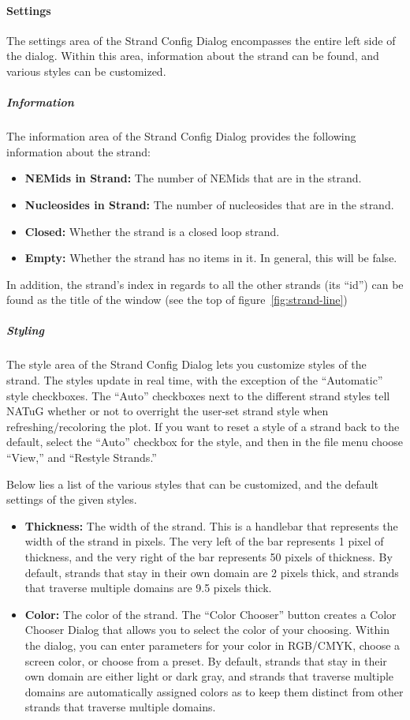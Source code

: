 \documentclass[titlepage]{article}
\begin{document}
\paragraph{Settings}
The settings area of the Strand Config Dialog encompasses the entire left side of the dialog. Within this area, information about the strand can be found, and various styles can be customized.

\subparagraph{Information}
The information area of the Strand Config Dialog provides the following information about the strand:
\begin{itemize}
	\item \textbf{NEMids in Strand:} The number of NEMids that are in the strand.
	\item \textbf{Nucleosides in Strand:} The number of nucleosides that are in the strand.
	\item \textbf{Closed:} Whether the strand is a closed loop strand.
	\item \textbf{Empty:} Whether the strand has no items in it. In general, this will be false.
\end{itemize} 
In addition, the strand's index in regards to all the other strands (its ``id'') can be found as the title of the window (see the top of figure~\ref{fig:strand-line})

\subparagraph{Styling}
The style area of the Strand Config Dialog lets you customize styles of the strand. The styles update in real time, with the exception of the ``Automatic'' style checkboxes. The ``Auto'' checkboxes next to the different strand styles tell NATuG whether or not to overright the user-set strand style when refreshing/recoloring the plot. If you want to reset a style of a strand back to the default, select the ``Auto'' checkbox for the style, and then in the file menu choose ``View,'' and ``Restyle Strands.''

Below lies a list of the various styles that can be customized, and the default settings of the given styles.
\begin{itemize}
	\item \textbf{Thickness:} The width of the strand. This is a handlebar that represents the width of the strand in pixels. The very left of the bar represents 1 pixel of thickness, and the very right of the bar represents 50 pixels of thickness. By default, strands that stay in their own domain are 2 pixels thick, and strands that traverse multiple domains are 9.5 pixels thick.
	\item \textbf{Color:} The color of the strand. The ``Color Chooser'' button creates a Color Chooser Dialog that allows you to select the color of your choosing. Within the dialog, you can enter parameters for your color in RGB/CMYK, choose a screen color, or choose from a preset. By default, strands that stay in their own domain are either light or dark gray, and strands that traverse multiple domains are automatically assigned colors as to keep them distinct from other strands that traverse multiple domains.
\end{itemize}
\end{document}
